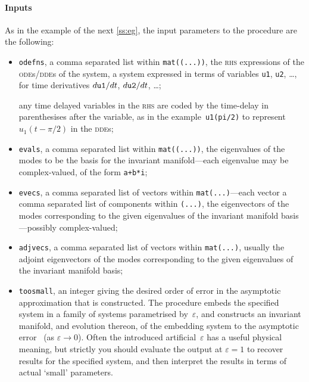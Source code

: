 \documentclass[11pt,a5paper]{article}
\def\eps{\varepsilon}
\begin{document}
\paragraph{Inputs}
As in the example of the next \cref{ss:eg}, the input
parameters to the procedure are the following:
\begin{itemize}

\item \verb|odefns|, a comma separated list within
\verb|mat((...))|, the \textsc{rhs} expressions of the
\textsc{ode}s/\textsc{dde}s of the system, a system
expressed in terms of variables \verb|u1|, \verb|u2|,
\ldots, for time derivatives \(\de t{\tt u1}\), \(\de t{\tt
u2}\), \ldots;

any time delayed variables in the \textsc{rhs} are coded by
the time-delay in parenthesises after the variable, as in
the example~\verb|u1(pi/2)| to represent~\(u_1(t-\pi/2)\) in
the \textsc{dde}s;

\item \verb|evals|, a comma separated list within
\verb|mat((...))|, the eigenvalues of the modes to be the
basis for the invariant manifold---each eigenvalue may be
complex-valued, of the form \verb|a+b*i|;

\item \verb|evecs|, a comma separated list of vectors within
\verb|mat(...)|---each vector a comma separated list of
components within \verb|(...)|, the eigenvectors of the
modes corresponding to the given eigenvalues of the
invariant manifold basis---possibly complex-valued;

\item \verb|adjvecs|, a comma separated list of vectors
within \verb|mat(...)|, usually the adjoint eigenvectors of
the modes corresponding to the given eigenvalues of the
invariant manifold basis;  

\item \verb|toosmall|, an integer giving the desired order
of error in the asymptotic approximation that is
constructed.  The procedure embeds the specified system in a
family of systems parametrised by~\(\eps\), and constructs
an invariant manifold, and evolution thereon, of the
embedding system to the asymptotic error~\Ord{\eps^{\tt
toosmall}} (as \(\eps\to0\)). Often the introduced
artificial~\(\eps\) has a useful physical meaning, but
strictly you should evaluate the output at \(\eps=1\) to
recover results for the specified system, and then interpret
the results in terms of actual `small' parameters.

\end{itemize}
\end{document}
